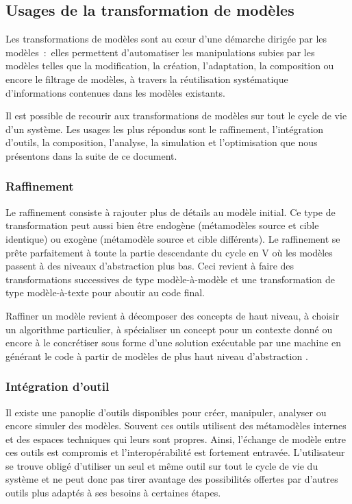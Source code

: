 \subsection{Usages de la transformation de modèles }
Les transformations de modèles sont au cœur d'une démarche dirigée par les 
modèles~:~elles permettent d'automatiser les manipulations subies par les 
modèles telles que la modification, la création, l'adaptation, la composition ou 
encore le filtrage de modèles, à travers la réutilisation systématique 
d'informations contenues dans les modèles existants. 

Il est possible de recourir aux transformations de modèles sur tout le cycle de 
vie d'un système. Les usages les plus répondus sont le raffinement, 
l'intégration d'outils, la composition, l'analyse, la simulation et 
l'optimisation que nous présentons dans la suite de ce document. 


\subsubsection{Raffinement}

Le raffinement consiste à rajouter plus de détails au modèle initial. Ce type de 
transformation peut aussi bien être endogène (métamodèles source et cible 
identique) ou exogène (métamodèle source et cible différents). Le raffinement se 
prête parfaitement à toute la partie descendante du cycle en V où les modèles 
passent à des niveaux d'abstraction plus bas. Ceci revient à faire des 
transformations successives de type modèle-à-modèle et une transformation de 
type modèle-à-texte pour aboutir au code final.

Raffiner un modèle revient à décomposer des concepts de haut niveau, à choisir 
un algorithme particulier, à spécialiser un concept pour un contexte donné ou 
encore à le concrétiser sous forme d'une solution exécutable par une machine en 
générant le code à partir de modèles de plus haut niveau d'abstraction 
\cite{czarnecki2000intentional}. 

\subsubsection{Intégration d'outil}

Il existe une panoplie d'outils disponibles pour créer, manipuler, analyser ou 
encore simuler des modèles. Souvent ces outils utilisent des métamodèles 
internes et des espaces techniques qui leurs sont propres. Ainsi, l'échange de 
modèle entre ces outils est compromis et l'interopérabilité est fortement 
entravée. L'utilisateur se trouve obligé d'utiliser un seul et même outil sur 
tout le cycle de vie du système et ne peut donc pas tirer avantage des 
possibilités offertes par d'autres outils plus adaptés à ses besoins à certaines 
étapes.

